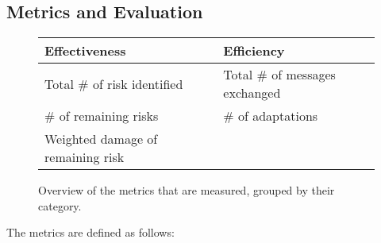

\subsection{Metrics and Evaluation}
\label{ssec:metrics}


\begin{figure}[H]
    \centering
    \begin{tabular}{l|l}
        \textbf{Effectiveness}            & \textbf{Efficiency}            \\ \hline
        Total \# of risk identified       & Total \# of messages exchanged \\
        \# of remaining risks             & \# of adaptations              \\
        Weighted damage of remaining risk &                               
    \end{tabular}
    \caption{\label{fig:metrics-groups}Overview of the metrics that are measured, grouped by their category.}
\end{figure}


The metrics are defined as follows:

